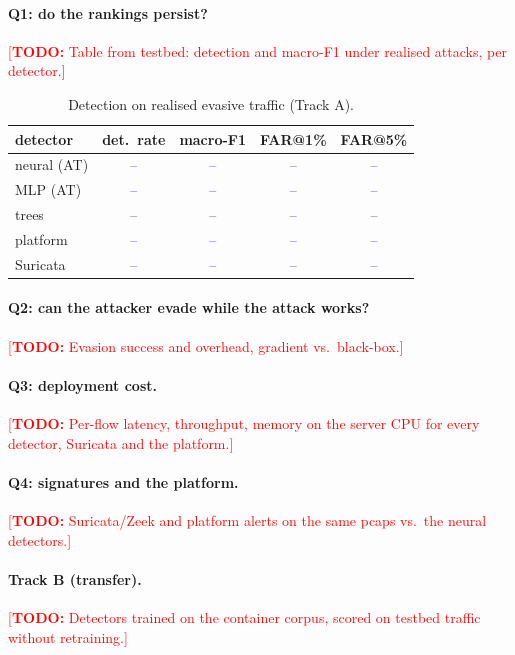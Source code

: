 \documentclass[letterpaper,twocolumn,10pt]{article}
\newcommand{\todo}[1]{\textcolor{red}{[\textbf{TODO:} #1]}}
\newcommand{\fromtestbed}[1]{\textcolor{blue}{#1}}  %
\begin{document}
\paragraph{Q1: do the rankings persist?} \todo{Table from testbed: detection and
macro-F1 under realised attacks, per detector.} %
\begin{table}[t]\centering\small
\begin{tabular}{lcccc}
\toprule
detector & det.\ rate & macro-F1 & FAR@1\% & FAR@5\%\\
\midrule
neural (AT) & \fromtestbed{--} & \fromtestbed{--} & \fromtestbed{--} & \fromtestbed{--}\\
MLP (AT) & \fromtestbed{--} & \fromtestbed{--} & \fromtestbed{--} & \fromtestbed{--}\\
trees & \fromtestbed{--} & \fromtestbed{--} & \fromtestbed{--} & \fromtestbed{--}\\
platform & \fromtestbed{--} & \fromtestbed{--} & \fromtestbed{--} & \fromtestbed{--}\\
Suricata & \fromtestbed{--} & \fromtestbed{--} & \fromtestbed{--} & \fromtestbed{--}\\
\bottomrule
\end{tabular}
\caption{Detection on realised evasive traffic (Track A).}\label{tab:detection}
\end{table}

\paragraph{Q2: can the attacker evade while the attack works?} \todo{Evasion
success and overhead, gradient vs.\ black-box.} %

\paragraph{Q3: deployment cost.} \todo{Per-flow latency, throughput, memory on the
server CPU for every detector, Suricata and the platform.} %

\paragraph{Q4: signatures and the platform.} \todo{Suricata/Zeek and platform
alerts on the same pcaps vs.\ the neural detectors.}

\paragraph{Track B (transfer).} \todo{Detectors trained on the container corpus,
scored on testbed traffic without retraining.}
\end{document}
